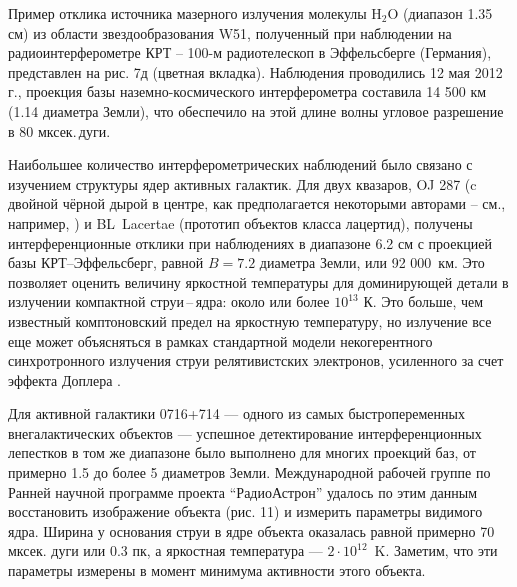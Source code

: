 Пример отклика источника мазерного излучения молекулы H$_2$O (диапазон 1.35 см)
из области звездообразования W51, полученный при наблюдении на
радиоинтерферометре КРТ -- 100-м  радиотелескоп в Эффельсберге
(Германия), представлен на рис. 7д (цветная вкладка). Наблюдения проводились 12 мая 2012 г.,
проекция базы наземно-космического интерферометра составила
14 500 км (1.14 диаметра Земли), что обеспечило на этой длине волны
угловое разрешение в 80 мксек.\,дуги.

Наибольшее количество интерферометрических наблюдений было связано с
изучением структуры ядер активных галактик. Для двух квазаров, OJ 287
(c двойной чёрной дырой в центре, как предполагается некоторыми авторами --
см., например, \cite{}) и BL~Lacertae
(прототип объектов класса лацертид), получены интерференционные отклики
при наблюдениях в диапазоне 6.2 см с проекцией базы КРТ--Эффельсберг,
равной $B = 7.2$ диаметра Земли, или 92 000~км.
Это позволяет оценить величину яркостной температуры
для доминирующей детали в излучении компактной струи\,--\,ядра:
около или более $10^{13}$ К.
Это больше, чем
известный комптоновский предел \cite{} на яркостную температуру,
но излучение все еще может объясняться в рамках стандартной модели
некогерентного синхротронного излучения струи релятивистских электронов,
усиленного за счет эффекта Доплера \cite{}.

Для активной галактики 0716+714 --- одного из самых быстропеременных
внегалактических объектов --- успешное детектирование интерференционных
лепестков в том же диапазоне было выполнено для многих проекций баз,
от примерно 1.5 до более 5 диаметров Земли. Международной рабочей группе по
Ранней научной программе проекта ``РадиоАстрон'' удалось по этим данным
восстановить изображение объекта (рис. 11) и измерить параметры видимого
ядра. Ширина у основания струи в ядре объекта оказалась равной примерно
70 мксек. дуги или 0.3 пк, а яркостная температура
--- $2 \cdot 10^{12}$~K. Заметим, что эти параметры измерены в момент
минимума активности этого объекта.

